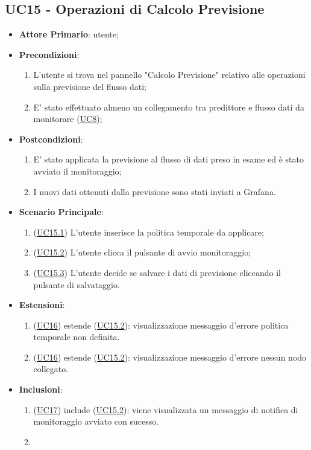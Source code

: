 	\subsection{UC15 - Operazioni di Calcolo Previsione}
		\begin{itemize}
			\item\textbf{Attore Primario}: utente;
			\item\textbf{Precondizioni}: 
				\begin{enumerate}
					\item L'utente si trova nel pannello "Calcolo Previsione" relativo alle operazioni sulla previsione del flusso dati;
					\item E' stato effettuato almeno un collegamento tra predittore e flusso dati da monitorare (\hyperref[par:UC8]{UC8});
				\end{enumerate}		
	\item\textbf{Postcondizioni}: 
				\begin{enumerate}
					\item E' stato applicata la previsione al flusso di dati preso in esame ed è stato avviato il monitoraggio; 
					\item I nuovi dati ottenuti dalla previsione sono stati inviati a Grafana.
				\end{enumerate}
			\item\textbf{Scenario Principale}: 
				\begin{enumerate} 
					\item (\hyperref[par:UC15.1]{UC15.1}) L'utente inserisce la politica temporale da applicare;
					\item (\hyperref[par:UC15.2]{UC15.2}) L'utente clicca il pulsante di avvio monitoraggio; 
					\item (\hyperref[par:UC15.3]{UC15.3}) L'utente decide se salvare i dati di previsione cliccando il pulsante di salvataggio.
				\end{enumerate}
			\item\textbf{Estensioni}: 
				\begin{enumerate} 
					\item (\hyperref[par:UC16]{UC16}) estende (\hyperref[par:UC15.2]{UC15.2}): visualizzazione messaggio d’errore politica temporale non definita.
					\item (\hyperref[par:UC16]{UC16}) estende (\hyperref[par:UC15.2]{UC15.2}): visualizzazione messaggio d’errore nessun nodo collegato.
				\end{enumerate}
			\item\textbf{Inclusioni}: 
				\begin{enumerate} 
					\item (\hyperref[par:UC17]{UC17}) include (\hyperref[par:UC15.2]{UC15.2}): viene visualizzata un messaggio di notifica di monitoraggio avviato con sucesso.
					\item 
				\end{enumerate}				
		\end{itemize}




